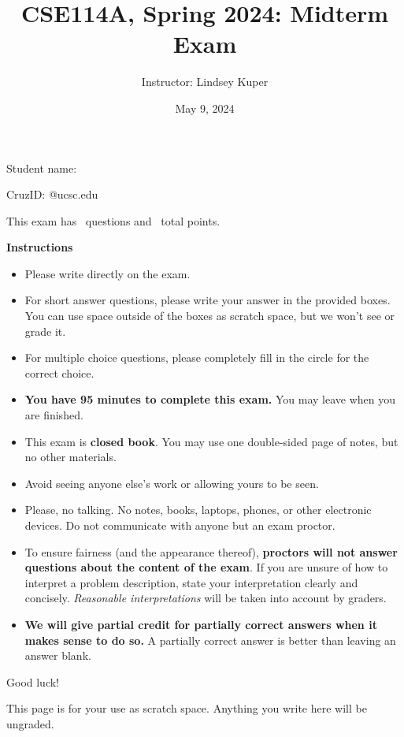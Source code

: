 \documentclass[addpoints]{exam}
\title{CSE114A, Spring 2024: Midterm Exam}
\author{Instructor: Lindsey Kuper}
\date{May 9, 2024}
\begin{document}
\maketitle

\begin{coverpages}

\bigskip  

\noindent Student name: \hrulefill

\bigskip
\bigskip

\noindent CruzID: \hrulefill @ucsc.edu

\bigskip
\bigskip

\noindent This exam has \numquestions~questions and \numpoints~total points.

\bigskip
\bigskip

\noindent \textbf{Instructions}

\begin{itemize}
\item Please write directly on the exam.
\item For short answer questions, please write your answer in the provided boxes.  You can use space outside of the boxes as scratch space, but we won't see or grade it.
\item For multiple choice questions, please completely fill in the circle for the correct choice.
\item \textbf{You have 95 minutes to complete this exam.} You may leave when you are finished.
\item This exam is \textbf{closed book}.  You may use one double-sided page of notes, but no other materials.
\item Avoid seeing anyone else's work or allowing yours to be seen.
\item Please, no talking.  No notes, books, laptops, phones, or other electronic devices. Do not communicate with anyone but an exam proctor.
\item To ensure fairness (and the appearance thereof),
  \textbf{proctors will not answer questions about the content of the exam}. If you are unsure 
  of how to interpret a problem description, state your interpretation clearly and concisely. 
  \textit{Reasonable interpretations} will be taken into account by graders.
\item \textbf{We will give partial credit for partially correct answers when it makes sense to do so.} A partially correct answer is better than leaving an answer blank.
\end{itemize}
  
\bigskip

\noindent Good luck!

\newpage

This page is for your use as scratch space. Anything you write here will be ungraded.

\newpage  

\end{coverpages}
\end{document}
